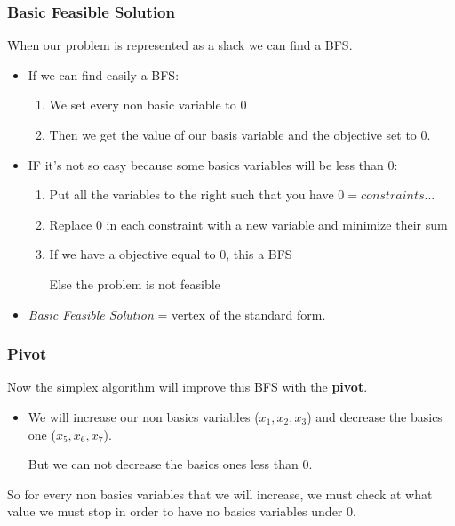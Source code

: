 \subsubsection{Basic Feasible Solution}
When our problem is represented as a slack we can find a BFS. 
\begin{itemize}
    \item If we can find easily a BFS:
        \begin{enumerate}
        \item We set every non basic variable to 0
        \item Then we get the value of our basis variable and 
            the objective set to 0. 
    \end{enumerate}

\item IF it's not so easy because some basics variables will be less
    than 0:
        \begin{enumerate}
        \item Put all the variables to the right such that you have
            $0 = constraints ...$
        \item Replace 0 in each constraint with a new variable
            and minimize their sum
        \item If we have a objective equal to 0, this a BFS

            Else the problem is not feasible
    \end{enumerate}

\item \textit{Basic Feasible Solution} = vertex of the standard form.

\end{itemize}

\subsubsection{Pivot}
Now the simplex algorithm will improve this BFS with the
\textbf{pivot}. 
\begin{itemize}
    \item We will increase our non
        basics variables ($x_1, x_2, x_3$) and decrease the basics one
        ($x_5, x_6, x_7$).
    \item[But] we can not decrease
        the basics ones less than 0. 
\end{itemize}

So for every non basics variables that we
will increase, we must check at what value we must stop in order to have
no basics variables under 0.

